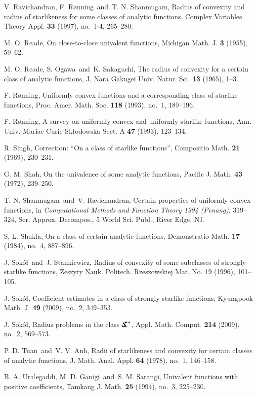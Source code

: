 \documentclass{amsart}
\begin{document}
\begin{thebibliography}{99}
V. Ravichandran, F. R\o nning\ and\ T. N. Shanmugam, Radius of convexity and radius of starlikeness for some classes of analytic functions, Complex Variables Theory Appl. {\bf 33} (1997), no.~1-4, 265--280.

 M. O. Reade, On close-to-close univalent functions, Michigan Math. J. {\bf 3} (1955), 59--62.

 M. O. Reade, S. Ogawa\ and\ K. Sakaguchi, The radius of convexity for a certain class of analytic functions, J. Nara Gakugei Univ. Natur. Sci. {\bf 13} (1965), 1--3.

F. R\o nning, Uniformly convex functions and a corresponding class of starlike functions, Proc. Amer. Math. Soc. {\bf 118} (1993), no.~1, 189--196.

 F. R\o nning, A survey on uniformly convex and uniformly starlike functions, Ann. Univ. Mariae Curie-Sk\l odowska Sect. A {\bf 47} (1993), 123--134.

 R. Singh, Correction: ``On a class of starlike functions'', Compositio Math. {\bf 21} (1969), 230--231.

 G. M. Shah, On the univalence of some analytic functions, Pacific J. Math. {\bf 43} (1972), 239--250.

T. N. Shanmugam\ and\ V. Ravichandran, Certain properties of uniformly convex functions, in {\it Computational Methods and Function Theory 1994 (Penang)}, 319--324, Ser. Approx. Decompos., 5 World Sci. Publ., River Edge, NJ.

 S. L. Shukla, On a class of certain analytic functions, Demonstratio Math. {\bf 17} (1984), no.~4, 887--896.

J. Sok\'o\l\ and\ J. Stankiewicz, Radius of convexity of some subclasses of strongly starlike functions, Zeszyty Nauk. Politech. Rzeszowskiej Mat. No. 19 (1996), 101--105.

J. Sok\'o\l, Coefficient estimates in a class of strongly starlike functions, Kyungpook Math. J. {\bf 49} (2009), no.~2, 349--353.

 J. Sok\'o\l, Radius problems in the class ${\mathcal{S\!\!\!L}}\sp *$, Appl. Math. Comput. {\bf 214} (2009), no.~2, 569--573.

 P. D. Tuan\ and\ V. V. Anh, Radii of starlikeness and convexity for certain classes of analytic functions, J. Math. Anal. Appl. {\bf 64} (1978), no.~1, 146--158.

 B. A. Uralegaddi, M. D. Ganigi\ and\ S. M. Sarangi, Univalent functions with positive coefficients, Tamkang J. Math. {\bf 25} (1994), no.~3, 225--230.

\end{thebibliography}
\end{document}
